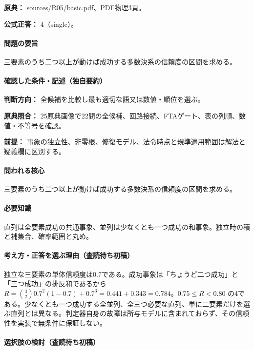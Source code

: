 \noindent\textbf{原典：} sources/R05/basic.pdf、PDF物理3頁。

\textbf{公式正答：} 4（single）。

\paragraph{問題の要旨} 三要素のうち二つ以上が動けば成功する多数決系の信頼度の区間を求める。

\paragraph{確認した条件・記述（独自要約）}\mbox{}\par

\noindent\textbf{判断方向：} 全候補を比較し最も適切な語又は数値・順位を選ぶ。\par

\noindent\textbf{原典照合：} 25原典画像で22問の全候補、回路接続、FTAゲート、表の列順、数値・不等号を確認。\par

\noindent\textbf{前提：} 事象の独立性、非零根、修復モデル、法令時点と規準適用範囲は解法と疑義欄に区別する。\par

\paragraph{問われる核心} 三要素のうち二つ以上が動けば成功する多数決系の信頼度の区間を求める。

\paragraph{必要知識} 直列は全要素成功の共通事象、並列は少なくとも一つ成功の和事象。独立時の積と補集合、確率範囲と丸め。

\paragraph{考え方・正答を選ぶ理由（査読待ち初稿）} 独立な三要素の単体信頼度は0.7である。成功事象は「ちょうど二つ成功」と「三つ成功」の排反和であるから \(R={3\choose2}0.7^2(1-0.7)+0.7^3=0.441+0.343=0.784\)。\(0.75\le R<0.80\) の4である。少なくとも一つ成功する全並列、全三つ必要な直列、単に二要素だけを選ぶ直列とは異なる。判定器自身の故障は所与モデルに含まれておらず、その信頼性を実装で無条件に保証しない。

\paragraph{選択肢の検討（査読待ち初稿）}\mbox{}\par


